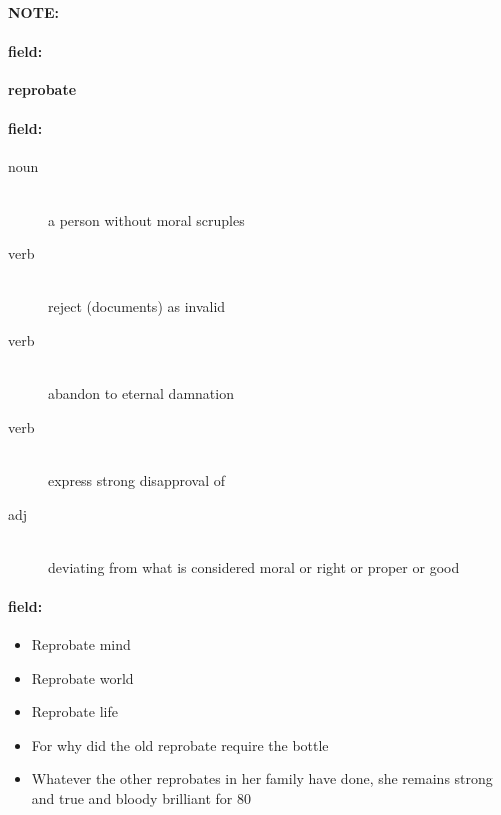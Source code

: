 \documentclass[12pt]{article}
\newenvironment{note}{\paragraph{NOTE:}}{}
\newenvironment{field}{\paragraph{field:}}{}
\begin{document}
\begin{note}
\begin{field}
\textbf{\large reprobate}
\end{field}


\begin{field}
\begin{description}
\item[noun] \hfill \\ 
a person without moral scruples

\item[verb] \hfill \\ 
reject (documents) as invalid

\item[verb] \hfill \\ 
abandon to eternal damnation

\item[verb] \hfill \\ 
express strong disapproval of

\item[adj] \hfill \\ 
deviating from what is considered moral or right or proper or good

\end{description}
\end{field}

\begin{field}
\begin{itemize}
\item Reprobate mind
\item Reprobate world
\item Reprobate life
\item For why did the old reprobate require the bottle
\item Whatever the other reprobates in her family have done, she remains strong and true and bloody brilliant for 80
\end{itemize}
\end{field}
\end{note}
\end{document}
